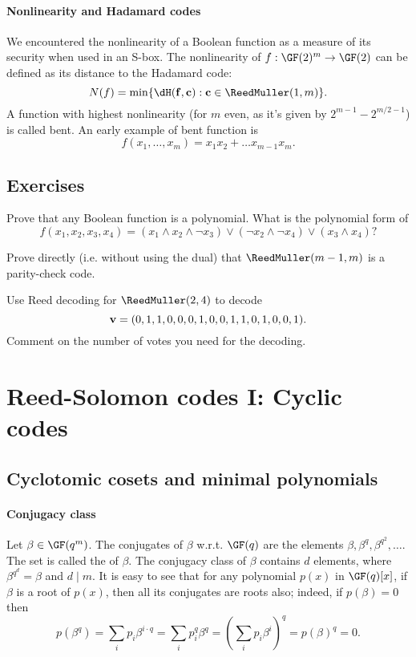 \documentclass[a4paper, 11pt, openany]{book}
\begin{document}
\paragraph{Nonlinearity and Hadamard codes} We encountered the nonlinearity of a Boolean function as a measure of its security when used in an S-box. The nonlinearity of $f : \GF(2)^m \to \GF(2)$ can be defined as its distance to the Hadamard code:
\[
    N(f) = \min \{ \dH({\bf f}, {\bf c}) : {\bf c} \in \ReedMuller(1,m) \}.
\]
A function with highest nonlinearity (for $m$ even, as it's given by $2^{m-1} - 2^{m/2-1}$) is called bent. An early example of bent function is
\[
    f(x_1, \dots, x_m) = x_1x_2 + \dots x_{m-1}x_m.
\]


\subsection{Exercises}

\begin{exercise}
Prove that any Boolean function is a polynomial. What is the polynomial form of
\[
	f(x_1, x_2, x_3, x_4) = (x_1 \land x_2 \land \neg x_3) \lor (\neg x_2 \land \neg x_4) \lor (x_3 \land x_4)?
\]
\end{exercise}



\begin{exercise}
Prove directly (i.e. without using the dual) that $\ReedMuller(m-1,m)$ is a parity-check code.
\end{exercise}


\begin{exercise}
Use Reed decoding for $\ReedMuller(2,4)$ to decode
\[
	{\bf v} = (0,1,1,0,0,0,1,0,0,1,1,0,1,0,0,1).
\]
Comment on the number of votes you need for the decoding.
\end{exercise}


\section{Reed-Solomon codes I: Cyclic codes}
\label{sec:26}




\subsection{Cyclotomic cosets and minimal polynomials}





\paragraph{Conjugacy class} Let $\beta \in \GF(q^m)$. The conjugates of $\beta$ w.r.t. $\GF(q)$ are the elements $\beta, \beta^q, \beta^{q^2}, \dots$. The set is called the  of $\beta$. The conjugacy class of $\beta$ contains $d$ elements, where $\beta^{q^d} = \beta$ and $d \mid m$. It is easy to see that for any polynomial $p(x)$ in $\GF(q)[x]$, if $\beta$ is a root of $p(x)$, then all its conjugates are roots also; indeed, if $p(\beta) = 0$ then
\[
    p(\beta^q) = \sum_i p_i \beta^{i \cdot q} = \sum_i p_i^q \beta^q = \left( \sum_i p_i \beta^i \right)^q = p(\beta)^q = 0.
\]
\end{document}
